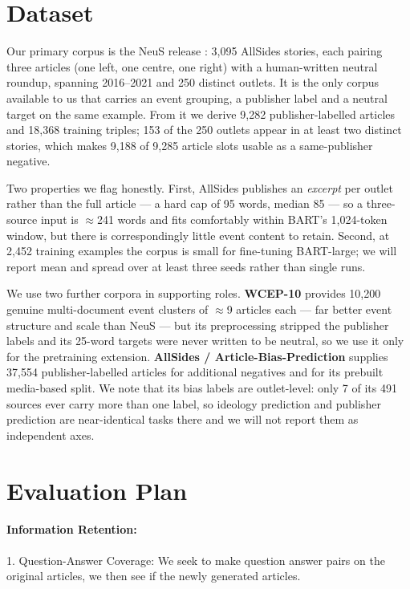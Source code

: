 \documentclass[10pt,twocolumn,a4paper]{article}
\begin{document}
\section{Dataset}

Our primary corpus is the NeuS release \cite{lee2022neus}: 3{,}095 AllSides
stories, each pairing three articles (one left, one centre, one right) with a
human-written neutral roundup, spanning 2016--2021 and 250 distinct outlets. It
is the only corpus available to us that carries an event grouping, a publisher
label and a neutral target on the same example. From it we derive 9{,}282
publisher-labelled articles and 18{,}368 training triples; 153 of the 250 outlets
appear in at least two distinct stories, which makes 9{,}188 of 9{,}285 article
slots usable as a same-publisher negative.

Two properties we flag honestly. First, AllSides publishes an \emph{excerpt} per
outlet rather than the full article --- a hard cap of 95 words, median 85 --- so
a three-source input is $\approx$241 words and fits comfortably within BART's
1{,}024-token window, but there is correspondingly little event content to
retain. Second, at 2{,}452 training examples the corpus is small for fine-tuning
BART-large; we will report mean and spread over at least three seeds rather than
single runs.

We use two further corpora in supporting roles. \textbf{WCEP-10}
\cite{ghalandari2020wcep} provides 10{,}200 genuine multi-document event clusters
of $\approx$9 articles each --- far better event structure and scale than NeuS
--- but its preprocessing stripped the publisher labels and its 25-word targets
were never written to be neutral, so we use it only for the pretraining
extension. \textbf{AllSides / Article-Bias-Prediction} \cite{baly2020detect}
supplies 37{,}554 publisher-labelled articles for additional negatives and for
its prebuilt media-based split. We note that its bias labels are outlet-level:
only 7 of its 491 sources ever carry more than one label, so ideology prediction
and publisher prediction are near-identical tasks there and we will not report
them as independent axes.

\section{Evaluation Plan}

\paragraph{Information Retention:} 
1. Question-Answer Coverage: We seek to make question answer pairs on the original articles, we then see if the newly generated articles. 
\end{document}
